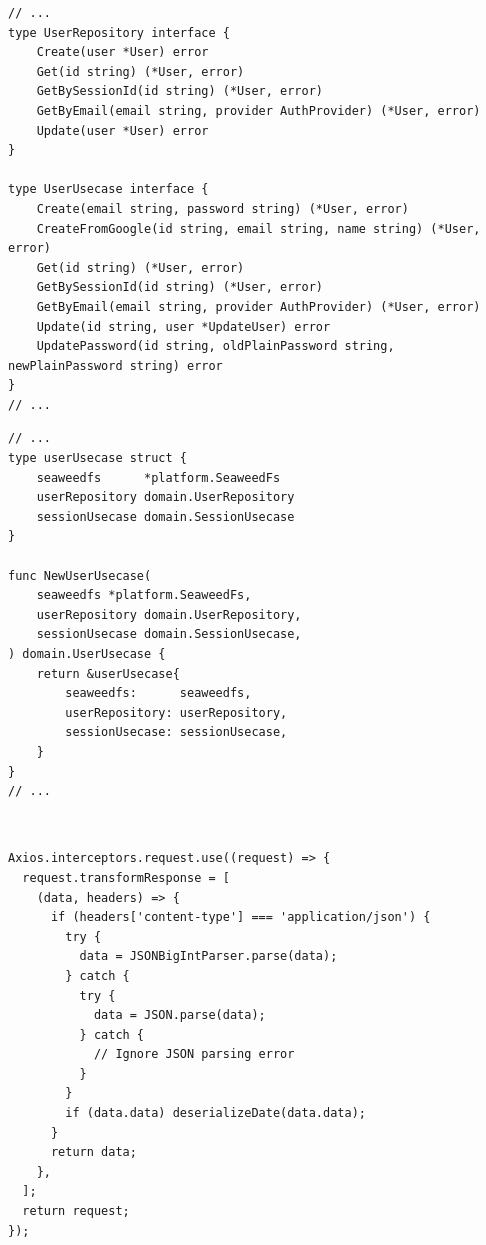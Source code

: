 \documentclass[12pt,one side,openright,a4paper]{cpe-thesis-th}
\begin{document}
\begin{lstlisting}[label={lst:appendix-user-domain}, caption={ชุดคำสั่งที่นิยาม Interface ของ User Repository และ User Usecase}]
// ...
type UserRepository interface {
    Create(user *User) error
    Get(id string) (*User, error)
    GetBySessionId(id string) (*User, error)
    GetByEmail(email string, provider AuthProvider) (*User, error)
    Update(user *User) error
}

type UserUsecase interface {
    Create(email string, password string) (*User, error)
    CreateFromGoogle(id string, email string, name string) (*User, error)
    Get(id string) (*User, error)
    GetBySessionId(id string) (*User, error)
    GetByEmail(email string, provider AuthProvider) (*User, error)
    Update(id string, user *UpdateUser) error
    UpdatePassword(id string, oldPlainPassword string, newPlainPassword string) error
}
// ...
\end{lstlisting}
\begin{lstlisting}[label={lst:appendix-user-usecase}, caption={ชุดคำสั่งสร้างและนิยาม UserUsecase ที่มีการ Implement UserRepository}]
// ...
type userUsecase struct {
    seaweedfs      *platform.SeaweedFs
    userRepository domain.UserRepository
    sessionUsecase domain.SessionUsecase
}

func NewUserUsecase(
    seaweedfs *platform.SeaweedFs,
    userRepository domain.UserRepository,
    sessionUsecase domain.SessionUsecase,
) domain.UserUsecase {
    return &userUsecase{
        seaweedfs:      seaweedfs,
        userRepository: userRepository,
        sessionUsecase: sessionUsecase,
    }
}
// ...
\end{lstlisting}

\pagebreak
 \\
\begin{lstlisting}[label={lst:appendix-bigintparser}, caption={ชุดคำสั่งที่นิยามการแปลงข้อมูล}]
Axios.interceptors.request.use((request) => {
  request.transformResponse = [
    (data, headers) => {
      if (headers['content-type'] === 'application/json') {
        try {
          data = JSONBigIntParser.parse(data);
        } catch {
          try {
            data = JSON.parse(data);
          } catch {
            // Ignore JSON parsing error
          }
        }
        if (data.data) deserializeDate(data.data);
      }
      return data;
    },
  ];
  return request;
});
\end{lstlisting}
\pagebreak
\end{document}
